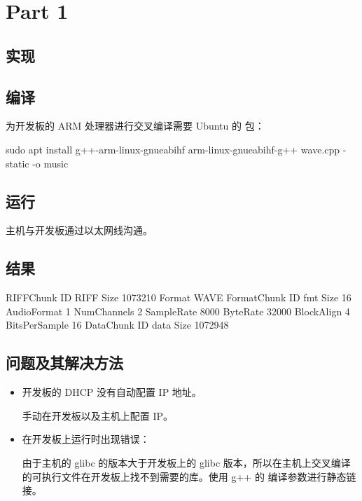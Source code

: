 \section{Part 1}


\subsection{实现}

\subsection{编译}

为开发板的 ARM 处理器进行交叉编译需要 Ubuntu 的  包：

\begin{codeblock}
sudo apt install g++-arm-linux-gnueabihf
arm-linux-gnueabihf-g++ wave.cpp -static -o music
\end{codeblock}

\subsection{运行}

主机与开发板通过以太网线沟通。

\subsection{结果}


\begin{codeblock}
RIFFChunk
    ID            RIFF
    Size          1073210
    Format        WAVE
FormatChunk
    ID            fmt 
    Size          16
    AudioFormat   1
    NumChannels   2
    SampleRate    8000
    ByteRate      32000
    BlockAlign    4
    BitsPerSample 16
DataChunk
    ID            data
    Size          1072948
\end{codeblock}


\subsection{问题及其解决方法}

\begin{itemize}
    \item 开发板的 DHCP 没有自动配置 IP 地址。
    
    手动在开发板以及主机上配置 IP。

    \item 在开发板上运行时出现错误：
    
    由于主机的 glibc 的版本大于开发板上的 glibc 版本，所以在主机上交叉编译的可执行文件在开发板上找不到需要的库。使用 g++ 的  编译参数进行静态链接。
\end{itemize}